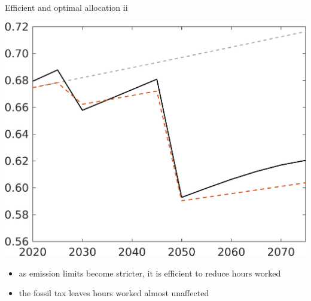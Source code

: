 \documentclass[11pt,aspectratio=169]{beamer}
\begin{document}
\begin{frame}{Efficient and optimal allocation ii }
\begin{minipage}[]{0.3\textwidth}
	\end{minipage}
		\begin{minipage}[]{0.3\textwidth}
		\includegraphics[width=1\textwidth]{../codding_model/own_basedOnFried/optimalPol_elastS_DisuSci/figures/all_1705/C_CompEffOPT_T_NoTaus_noopt_spillover0_noskill0_sep1_BN0_ineq0_red0_xgrowth0_zero0_countec0_etaa0.79_lgd0_lff1.png}
	\end{minipage}
	
	\vspace{3mm}

	\begin{itemize}
\item as emission limits become stricter, it is efficient to reduce hours worked
		\item the fossil tax leaves hours worked almost unaffected
	\end{itemize}
\end{frame}
\end{document}
